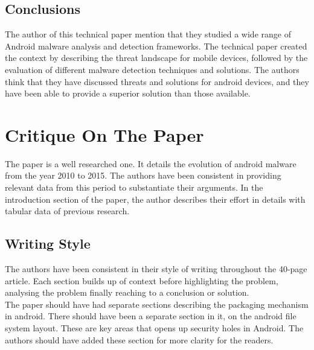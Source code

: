 \documentclass[12pt]{article}
\begin{document}
\subsection{Conclusions}\label{ref:paper_conclusions}
The author of this technical paper mention that they studied a wide range of Android malware analysis and detection frameworks. The technical paper created the context by describing the threat landscape for mobile devices, followed by the evaluation of different malware detection techniques and solutions. The authors think that they have discussed threats and solutions for android devices, and they have been able to provide a superior solution than those available. 

\section{Critique On The Paper}\label{ref:critique_discussion}
The paper is a well researched one. It details the evolution of android malware from the year 2010 to 2015. The authors have been consistent in providing relevant data from this period to substantiate their arguments. In the introduction section of the paper, the author describes their effort in details with tabular data of previous research. 

\subsection{Writing Style}\label{ref:critique_scope}
The authors have been consistent in their style of writing throughout the 40-page article. Each section builds up of context before highlighting the problem, analysing the problem finally reaching  to a conclusion or solution. \\
The paper should have had separate sections describing the packaging mechanism in android. There should have been a separate section in it, on the android file system layout. These are key areas that opens up security holes in Android. The authors should have added these section for more clarity for the readers. \\
\end{document}
